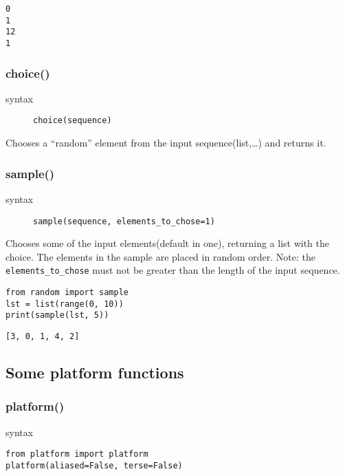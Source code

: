 \documentclass[11pt]{article}
\begin{document}
\begin{verbatim}
0
1
12
1
\end{verbatim}

\subsubsection{choice()}
\label{sec:org871d314}
\begin{description}
\item[{syntax}] \texttt{choice(sequence)}
\end{description}
Chooses a “random” element from the input sequence(list,\ldots{}) and
returns it.
\subsubsection{sample()}
\label{sec:orgba30ba0}
\begin{description}
\item[{syntax}] \texttt{sample(sequence, elements\_to\_chose=1)}
\end{description}
Chooses some of the input elements(default in one), returning a list with the
choice. The elements in the sample are placed in random order. Note:
the \texttt{elements\_to\_chose} must not be greater than the length of the input
sequence.


\begin{verbatim}
from random import sample
lst = list(range(0, 10))
print(sample(lst, 5))
\end{verbatim}

\begin{verbatim}
[3, 0, 1, 4, 2]
\end{verbatim}


\newpage

\subsection{Some platform functions}
\label{sec:org9cf9e94}
\subsubsection{platform()}
\label{sec:orga29f3bf}
\begin{description}
\item[{syntax}] 
\end{description}
\begin{verbatim}
from platform import platform
platform(aliased=False, terse=False)
\end{verbatim}
\end{document}
